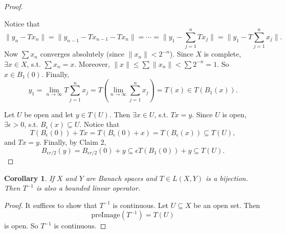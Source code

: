 \documentclass[12pt]{article}
\theoremstyle{plain}
\newtheorem*{corollary}{Corollary}
\theoremstyle{definition}
\begin{document}
\begin{proof}
\begin{description}
            Notice that 
            \[
                \|y_n - Tx_n\| = \|y_{n-1} - Tx_{n-1} - Tx_n\| = \cdots = \|y_1 - \sum_{j=1}^n Tx_j\| = \|y_1 -
                T\sum_{j=1}^n x_j\|.
            \]
            Now $\sum x_n$ converges absolutely (since $\|x_n\|<2^{-n}$).
            Since $X$ is complete, $\exists x\in X$, s.t. $\sum x_n = x$.
            Moreover, $\|x\|\leq \sum \|x_n\| < \sum 2^{-n} = 1$.
            So $x\in B_1(0)$.
            Finally,
            \[
                y_1 = \lim_{n\rightarrow\infty} T\sum_{j=1}^n x_j = T(\lim_{n\rightarrow\infty} \sum_{j=1}^n x_j) = T(x)
                \in T(B_1(x)).
            \]
    \end{description}
    Let $U$ be open and let $y\in T(U)$.
    Then $\exists x\in U$, s.t. $Tx=y$.
    Since $U$ is open, $\exists \epsilon > 0$, s.t. $B_\epsilon(x)\subseteq U$.
    Notice that
    \[
        T(B_{\epsilon}(0)) + Tx = T(B_{\epsilon}(0) + x) = T(B_\epsilon(x)) \subseteq T(U),
    \]
    and $Tx=y$.
    Finally, by Claim 2, 
    \[
        B_{\epsilon r/2}(y) = B_{\epsilon r/2}(0) + y \subseteq \epsilon T(B_1(0)) + y \subseteq T(U).
    \]
\end{proof}

\begin{corollary}
    If $X$ and $Y$ are Banach spaces and $T\in L(X,Y)$ is a bijection.
    Then $T^{-1}$ is also a bounded linear operator.
\end{corollary}
\begin{proof}
    It suffices to show that $T^{-1}$ is continuous.
    Let $U\subseteq X$ be an open set.
    Then
    \[
        \text{preImage}(T^{-1}) = T(U)
    \]
    is open.
    So $T^{-1}$ is continuous.
\end{proof}
\end{document}

